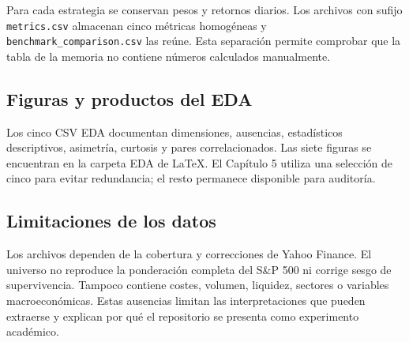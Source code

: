 Para cada estrategia se conservan pesos y retornos diarios. Los archivos con sufijo \texttt{metrics.csv} almacenan cinco métricas homogéneas y \texttt{benchmark\_comparison.csv} las reúne. Esta separación permite comprobar que la tabla de la memoria no contiene números calculados manualmente.

\subsection{Figuras y productos del EDA}

Los cinco CSV EDA documentan dimensiones, ausencias, estadísticos descriptivos, asimetría, curtosis y pares correlacionados. Las siete figuras se encuentran en la carpeta EDA de LaTeX. El Capítulo 5 utiliza una selección de cinco para evitar redundancia; el resto permanece disponible para auditoría.

\subsection{Limitaciones de los datos}

Los archivos dependen de la cobertura y correcciones de Yahoo Finance. El universo no reproduce la ponderación completa del S\&P 500 ni corrige sesgo de supervivencia. Tampoco contiene costes, volumen, liquidez, sectores o variables macroeconómicas. Estas ausencias limitan las interpretaciones que pueden extraerse y explican por qué el repositorio se presenta como experimento académico.
